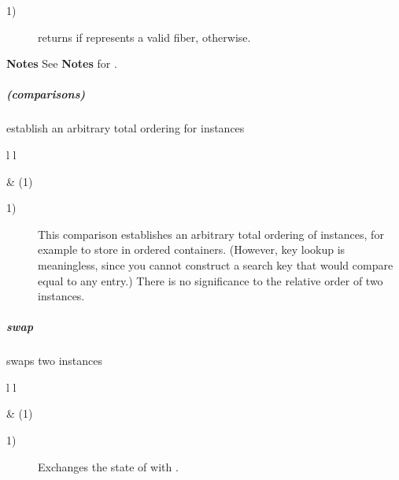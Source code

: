 \begin{description}
    \item[1)] returns  if  represents a valid fiber,
               otherwise.
\end{description}

{\bfseries Notes}
\newline
See {\bfseries Notes} for \opbool.

\subparagraph*{(comparisons)}
establish an arbitrary total ordering for \xtfiber instances\\

\begin{tabular}{ l l }
    \midrule

     & (1)\\

    \midrule
\end{tabular}

\begin{description}
    \item[1)] This comparison establishes an arbitrary total ordering of \xtfiber
              instances, for example to store in ordered containers. (However,
              key lookup is meaningless, since you cannot construct a search key
              that would compare equal to any entry.) There is no significance
              to the relative order of two instances.
\end{description}


\subparagraph*{swap}
swaps two \xtfiber instances\\

\begin{tabular}{ l l }
    \midrule

     & (1)\\

    \midrule
\end{tabular}

\begin{description}
    \item[1)] Exchanges the state of  with .\\
\end{description}
